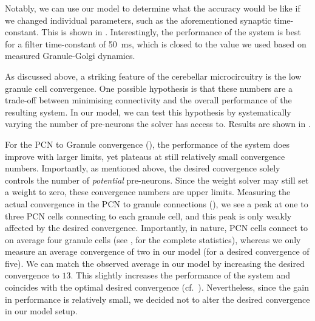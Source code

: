 Notably, we can use our model to determine what the accuracy would be like if we changed individual parameters, such as the aforementioned synaptic time-constant.
This is shown in .
Interestingly, the performance of the system is best for a filter time-constant of \SI{50}{\milli\second}, which is closed to the value we used based on measured Granule-Golgi dynamics.

As discussed above, a striking feature of the cerebellar microcircuitry is the low granule cell convergence. One possible hypothesis is that these numbers are a trade-off between minimising connectivity and the overall performance of the resulting system.
In our model, we can test this hypothesis by systematically varying the number of pre-neurons the solver has access to. Results are shown in .

For the PCN to Granule convergence (), the performance of the system does improve with larger limits, yet plateaus at still relatively small convergence numbers.
Importantly, as mentioned above, the desired convergence solely controls the number of \emph{potential} pre-neurons.
Since the weight solver may still set a weight to zero, these convergence numbers are upper limits.
Measuring the actual convergence in the PCN to granule connections (), we see a peak at one to three PCN cells connecting to each granule cell, and this peak is only weakly affected by the desired convergence.
Importantly, in nature, PCN cells connect to on average four granule cells (see \cite{palkovits1972quantitative}, for the complete statistics), whereas we only measure an average convergence of two in our model (for a desired convergence of five).
We can match the observed average in our model by increasing the desired convergence to $13$.
This slightly increases the performance of the system and coincides with the optimal desired convergence (cf.~).
Nevertheless, since the gain in performance is relatively small, we decided not to alter the desired convergence in our model setup.

